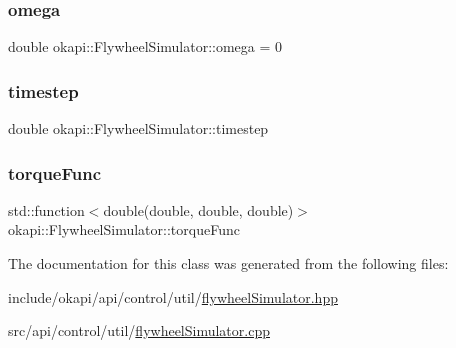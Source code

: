\mbox{\label{classokapi_1_1FlywheelSimulator_aaf02971fd228412b827a7514c664c078}} 
\subsubsection{\texorpdfstring{omega}{omega}}
{\footnotesize\ttfamily double okapi\+::\+Flywheel\+Simulator\+::omega = 0\hspace{0.3cm}{\ttfamily [protected]}}

\mbox{\label{classokapi_1_1FlywheelSimulator_aee4eecf39f0784452187154037a5acd2}} 
\subsubsection{\texorpdfstring{timestep}{timestep}}
{\footnotesize\ttfamily double okapi\+::\+Flywheel\+Simulator\+::timestep\hspace{0.3cm}{\ttfamily [protected]}}

\mbox{\label{classokapi_1_1FlywheelSimulator_a84b1705cb4bcc8569e1a5f738ae7c129}} 
\subsubsection{\texorpdfstring{torqueFunc}{torqueFunc}}
{\footnotesize\ttfamily std\+::function$<$double(double, double, double)$>$ okapi\+::\+Flywheel\+Simulator\+::torque\+Func\hspace{0.3cm}{\ttfamily [protected]}}



The documentation for this class was generated from the following files\+:\begin{DoxyCompactItemize}
\item 
include/okapi/api/control/util/\mbox{\hyperlink{flywheelSimulator_8hpp}{flywheel\+Simulator.\+hpp}}\item 
src/api/control/util/\mbox{\hyperlink{flywheelSimulator_8cpp}{flywheel\+Simulator.\+cpp}}\end{DoxyCompactItemize}
